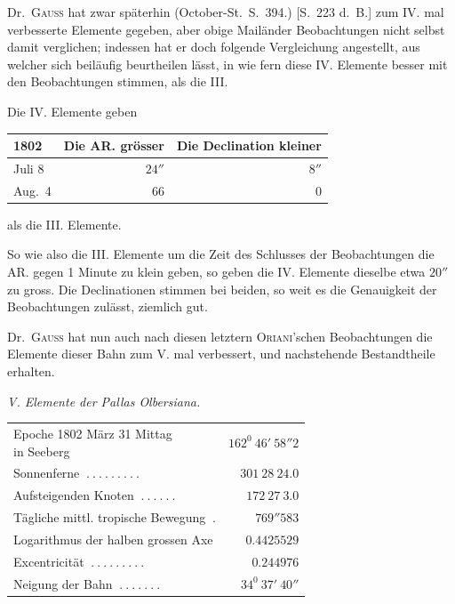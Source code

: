 Dr.\ \textsc{Gauss} hat zwar späterhin (October-St.\ S.\ 394.) [S.\ 223 d.\ B.] zum IV. mal verbesserte Elemente gegeben, aber obige Mailänder Beobachtungen nicht selbst damit verglichen; indessen hat er doch folgende Vergleichung angestellt, aus welcher sich beiläufig beurtheilen lässt, in wie fern diese IV. Elemente besser mit den Beobachtungen stimmen, als die III.
\begin{center}
Die IV. Elemente geben\par\medskip
\begin{tabular}{l|r|r}
1802&Die AR. grösser&Die Declination kleiner\\\hline
Juli 8&$24''$&$8''$\\
Aug.\ 4&$66$&$0$
\end{tabular}\par\medskip
als die III. Elemente.
\end{center}

So wie also die III. Elemente um die Zeit des Schlusses der Beobachtungen die AR. gegen 1 Minute zu klein geben, so geben die IV. Elemente dieselbe etwa $20''$ zu gross. Die Declinationen stimmen bei beiden, so weit es die Genauigkeit der Beobachtungen zulässt, ziemlich gut.

Dr.\ \textsc{Gauss} hat nun auch nach diesen letztern \textsc{Oriani}'schen Beobachtungen die Elemente dieser Bahn zum V. mal verbessert, und nachstehende Bestandtheile erhalten.
\begin{center}\textit{V. Elemente der Pallas Olbersiana.}\end{center}
\begin{center}
\begingroup\small\setlength{\tabcolsep}{3pt}
\begin{tabular}{l r}
\shortstack[l]{Epoche 1802 März 31 Mittag\\in Seeberg}&$162^0\ 46'\ 58''2$\\
Sonnenferne $\ .\ .\ .\ .\ .\ .\ .\ .\ .$&$301\ 28\ 24.0$\\
Aufsteigenden Knoten $\ .\ .\ .\ .\ .\ .$&$172\ 27\ 3.0$\\
Tägliche mittl. tropische Bewegung $\ .$&$769''583$\\[3pt]
Logarithmus der halben grossen Axe&$0.4425529$\\
Excentricität $\ .\ .\ .\ .\ .\ .\ .\ .\ .$&$0.244976$\\
Neigung der Bahn $\ .\ .\ .\ .\ .\ .\ .$&$34^0\ 37'\ 40''$
\end{tabular}\endgroup
\end{center}


